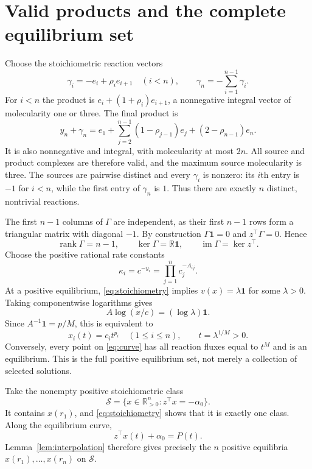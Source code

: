 \documentclass[11pt]{amsart}
\newcommand{\Rpos}{\mathbb R_{>0}}
\newcommand{\one}{\mathbf 1}
\begin{document}
\section{Valid products and the complete equilibrium set}
Choose the stoichiometric reaction vectors
\begin{equation}\label{eq:reactionvectors}
 \gamma_i=-e_i+\rho_i e_{i+1}\quad(i<n),\qquad
 \gamma_n=-\sum_{i=1}^{n-1}\gamma_i.
\end{equation}
For $i<n$ the product is $e_i+(1+\rho_i)e_{i+1}$, a nonnegative
integral vector of molecularity one or three. The final product is
\begin{equation}\label{eq:lastproduct}
 y_n+\gamma_n=e_1+\sum_{j=2}^{n-1}(1-\rho_{j-1})e_j
                   +(2-\rho_{n-1})e_n.
\end{equation}
It is also nonnegative and integral, with molecularity at most $2n$.
All source and product complexes are therefore valid, and the maximum
source molecularity is three. The sources are pairwise distinct and
every $\gamma_i$ is nonzero: its $i$th entry is $-1$ for $i<n$, while
the first entry of $\gamma_n$ is $1$. Thus there are exactly $n$
distinct, nontrivial reactions.

The first $n-1$ columns of $\Gamma$ are independent, as their first
$n-1$ rows form a triangular matrix with diagonal $-1$.
By construction $\Gamma\one=0$ and $z^\top\Gamma=0$. Hence
\begin{equation}\label{eq:stoichiometry}
 \operatorname{rank}\Gamma=n-1,\qquad
 \ker\Gamma=\mathbb R\one,\qquad
 \operatorname{im}\Gamma=\ker z^\top.
\end{equation}
Choose the positive rational rate constants
\begin{equation}\label{eq:rates}
 \kappa_i=c^{-y_i}=\prod_{j=1}^n c_j^{-A_{ij}}.
\end{equation}
At a positive equilibrium, \eqref{eq:stoichiometry} implies
$v(x)=\lambda\one$ for some $\lambda>0$. Taking componentwise
logarithms gives
\[
 A\log(x/c)=(\log\lambda)\one.
\]
Since $A^{-1}\one=p/M$, this is equivalent to
\begin{equation}\label{eq:curve}
 x_i(t)=c_i t^{p_i}\quad(1\le i\le n),\qquad t=\lambda^{1/M}>0.
\end{equation}
Conversely, every point on \eqref{eq:curve} has all reaction fluxes
equal to $t^M$ and is an equilibrium. This is the full positive
equilibrium set, not merely a collection of selected solutions.

Take the nonempty positive stoichiometric class
\begin{equation}\label{eq:class}
 \mathcal S=\{x\in\Rpos^n:z^\top x=-\alpha_0\}.
\end{equation}
It contains $x(r_1)$, and \eqref{eq:stoichiometry} shows that it is
exactly one class. Along the equilibrium curve,
\begin{equation}\label{eq:intersection}
 z^\top x(t)+\alpha_0=P(t).
\end{equation}
Lemma~\ref{lem:interpolation} therefore gives precisely the $n$
positive equilibria $x(r_1),\ldots,x(r_n)$ on $\mathcal S$.
\end{document}
